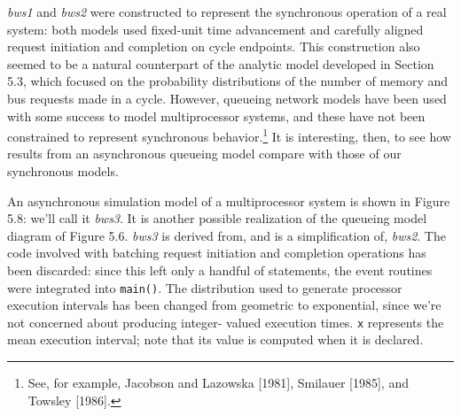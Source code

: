 \emph{bws1} and \emph{bws2} were constructed to represent the synchronous operation of
a real system: both models used fixed-unit time advancement and carefully
aligned request initiation and completion on cycle endpoints. This construction
also seemed to be a natural counterpart of the analytic model developed
in Section 5.3, which focused on the probability distributions of the number of
memory and bus requests made in a cycle. However, queueing network models
have been used with some success to model multiprocessor systems, and these
have not been constrained to represent synchronous behavior.\footnote{See, for example, Jacobson and Lazowska [1981], Smilauer [1985], and Towsley [1986].} It is
interesting, then, to see how results from an asynchronous queueing model
compare with those of our synchronous models.

An asynchronous simulation model of a multiprocessor system is shown in
Figure 5.8: we'll call it \emph{bws3}. It is another possible realization of the
queueing model diagram of Figure 5.6. \emph{bws3} is derived from, and is a simplification
of, \emph{bws2}. The code involved with batching request initiation and
completion operations has been discarded: since this left only a handful of
statements, the event routines were integrated into \texttt{main()}. The distribution
used to generate processor execution intervals has been changed from
geometric to exponential, since we're not concerned about producing integer-
valued execution times. \texttt{x} represents the mean execution interval; note that
its value is computed when it is declared.

